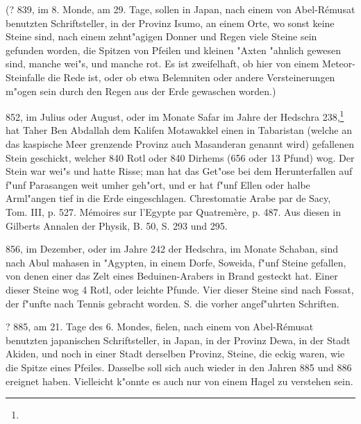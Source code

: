\documentclass[a4paper, 11pt, oneside, polutonikogreek, german]{article}
\begin{document}
(? 839, im 8. Monde, am 29. Tage, sollen in Japan, nach einem von Abel-Rémusat benutzten Schriftsteller, in der Provinz Isumo, an einem Orte, wo sonst keine Steine sind, nach einem zehnt"agigen Donner und Regen viele Steine sein gefunden worden, die Spitzen von Pfeilen und kleinen "Axten "ahnlich gewesen sind, manche wei"s, und manche rot. Es ist zweifelhaft, ob hier von einem Meteor-Steinfalle die Rede ist, oder ob etwa Belemniten oder andere Versteinerungen m"ogen sein durch den Regen aus der Erde gewaschen worden.)

852, im Julius oder August, oder im Monate Safar im Jahre der Hedschra 238,\footnote{} hat Taher Ben Abdallah dem Kalifen Motawakkel einen in Tabaristan (welche an das kaspische Meer grenzende Provinz auch Masanderan genannt wird) gefallenen Stein geschickt, welcher 840 Rotl oder 840 Dirhems (656 oder 13 Pfund) wog. Der Stein war wei"s und hatte Risse; man hat das Get"ose bei dem Herunterfallen auf f"unf Parasangen weit umher geh"ort, und er hat f"unf Ellen oder halbe Arml"angen tief in die Erde eingeschlagen. Chrestomatie Arabe par de Sacy, Tom. III, p. 527. Mémoires sur l'Egypte par Quatremère, p. 487. Aus diesen in Gilberts Annalen der Physik, B. 50, S. 293 und 295.

856, im Dezember, oder im Jahre 242 der Hedschra, im Monate Schaban, sind nach Abul mahasen in "Agypten, in einem Dorfe, Soweida, f"unf Steine gefallen, von denen einer das Zelt eines Beduinen-Arabers in Brand gesteckt hat. Einer dieser Steine wog 4 Rotl, oder leichte Pfunde. Vier dieser Steine sind nach Fossat, der f"unfte nach Tennis gebracht worden. S. die vorher angef"uhrten Schriften.

? 885, am 21. Tage des 6. Mondes, fielen, nach einem von Abel-Rémusat benutzten japanischen Schriftsteller, in Japan, in der Provinz Dewa, in der Stadt Akiden, und noch in einer Stadt derselben Provinz, Steine, die eckig waren, wie die Spitze eines Pfeiles. Dasselbe soll sich auch wieder in den Jahren 885 und 886 ereignet haben. Vielleicht k"onnte es auch nur von einem Hagel zu verstehen sein.
\end{document}

